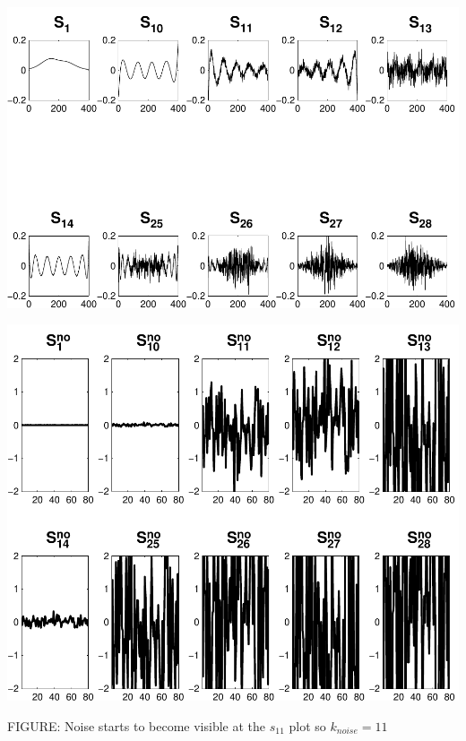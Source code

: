 \documentclass[11pt]{amsart}
\begin{document}
	
	
	\vspace{5mm}
	\begin{minipage}[t]{0.5\textwidth}
	
		\includegraphics[width=.95\linewidth]{figures/run2/sk_plots} 
   
	\end{minipage}
	\begin{minipage}[t]{0.5\textwidth}
	
		\includegraphics[width=.75\linewidth]{figures/run2/noise_parts} 
   
	\end{minipage}
	\begin{center}
		FIGURE: 
		Noise starts to become visible at the $s_{11}$ plot so $k_{noise}=11$
	\end{center} 
	\vspace{5mm}
	
\end{document}
